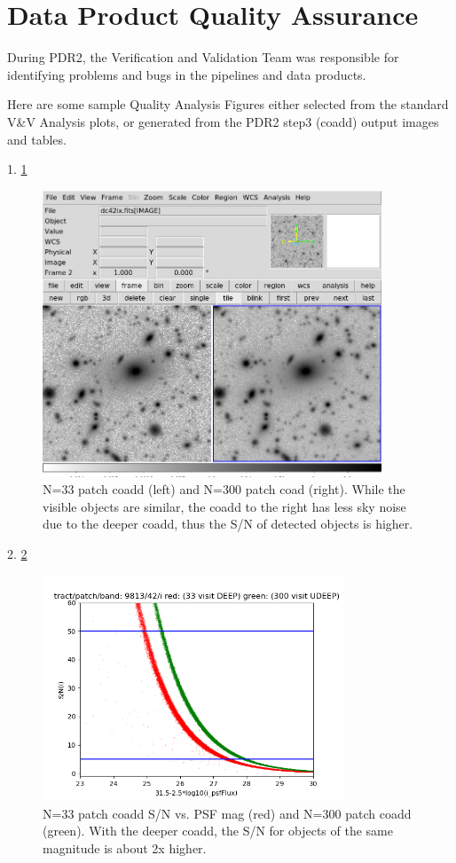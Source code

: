 \section{Data Product Quality Assurance} \label{sec:qa}

During PDR2, the Verification and Validation Team was responsible 
for identifying problems and bugs in the pipelines and data products. 

Here are some sample Quality Analysis Figures either selected from the 
standard V\&V Analysis plots, or generated from the PDR2 step3 (coadd) 
output images and tables.

1. \ref{fig:coadd}  

 \begin{figure}[h]
 \includegraphics[width=0.9\textwidth]{sidebyside9813p42bi.png}
	 \caption{N=33 patch coadd (left) and N=300 patch coad (right).  While the visible objects are similar, the coadd to the right has less sky noise due to the deeper coadd, thus the S/N of detected objects is higher.  \label{fig:coadd}}
 \end{figure}


2. \ref{fig:s2n}

 \begin{figure}[h]
 \includegraphics[width=0.8\textwidth,natwidth=600,natheight=600]{redgreen31.5.png}
	 \caption{N=33 patch coadd S/N vs. PSF mag (red) and N=300 patch coadd (green).  With the deeper coadd, the S/N for objects of the same magnitude is about 2x higher.  \label{fig:s2n}}
 \end{figure}

